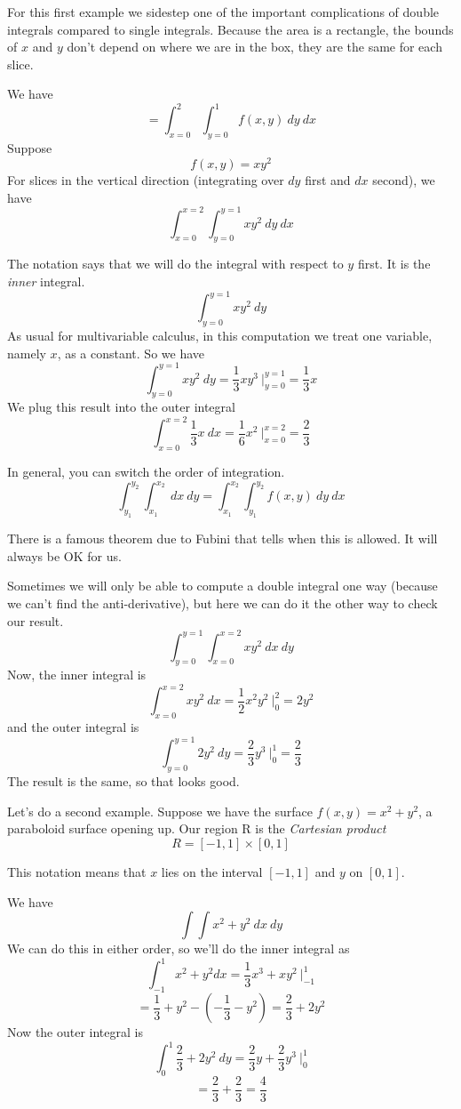 \documentclass[11pt, oneside]{article}
\begin{document}
For this first example we sidestep one of the important complications of double integrals compared to single integrals.  Because the area is a rectangle, the bounds of $x$ and $y$ don't depend on where we are in the box, they are the same for each slice.

We have
\[ =  \int_{x = 0}^{2} \int_{y = 0}^{1}  f(x,y) \ dy \ dx \]
Suppose
\[ f(x,y) = xy^2 \]
For slices in the vertical direction (integrating over $dy$ first and $dx$ second), we have
\[ \int_{x=0}^{x=2} \int_{y=0}^{y=1} xy^2 \ dy \ dx \]

The notation says that we will do the integral with respect to $y$ first.  It is the \emph{inner} integral.
\[ \int_{y=0}^{y=1} xy^2 \ dy \]
As usual for multivariable calculus, in this computation we treat one variable, namely $x$, as a constant.  So we have
\[ \int_{y=0}^{y=1} xy^2 \ dy = \frac{1}{3} xy^3 \ \bigg |_{y=0}^{y=1} = \frac{1}{3}x \]
We plug this result into the outer integral
\[ \int_{x=0}^{x=2} \frac{1}{3}x  \ dx = \frac{1}{6} x^2 \ \bigg |_{x=0}^{x=2} = \frac{2}{3} \]

In general, you can switch the order of integration.  
\[ \int_{y_1}^{y_2}  \int_{x_1}^{x_2}  \ dx \ dy =\int_{x_1}^{x_2} \int_{y_1}^{y_2}  f(x,y) \ dy \ dx \]

There is a famous theorem due to Fubini that tells when this is allowed.  It will always be OK for us.

Sometimes we will only be able to compute a double integral one way (because we can't find the anti-derivative), but here we can do it the other way to check our result.
\[ \int_{y=0}^{y=1} \int_{x=0}^{x=2} xy^2 \ dx \ dy \]
Now, the inner integral is 
\[ \int_{x=0}^{x=2} xy^2 \ dx = \frac{1}{2} x^2y^2 \ \bigg |_0^2 = 2y^2 \]
and the outer integral is
\[ \int_{y=0}^{y=1} 2y^2 \ dy = \frac{2}{3}y^3 \ \bigg |_0^1 = \frac{2}{3} \]
The result is the same, so that looks good.

Let's do a second example.  Suppose we have the surface $f(x,y) = x^2 + y^2$,  a paraboloid surface opening up.  Our region R is the \emph{Cartesian product} 
\[ R = [-1,1] \times [0,1] \]

This notation means that $x$ lies on the interval $[-1,1]$ and $y$ on $[0,1]$.

We have 
\[ \int \int x^2 + y^2 \ dx \ dy \]
We can do this in either order, so we'll do the inner integral as
\[ \int_{-1}^1 x^2 + y^2 dx = \frac{1}{3}x^3 + xy^2 \ \bigg |_{-1}^{1} \]
\[ = \frac{1}{3} + y^2 - (-\frac{1}{3} - y^2) = \frac{2}{3} + 2y^2 \]
Now the outer integral is
\[ \int_0^1 \frac{2}{3} + 2y^2 \ dy = \frac{2}{3}y + \frac{2}{3}y^3  \ \bigg |_{0}^{1} \]
\[ = \frac{2}{3} + \frac{2}{3} = \frac{4}{3} \]
\end{document}
